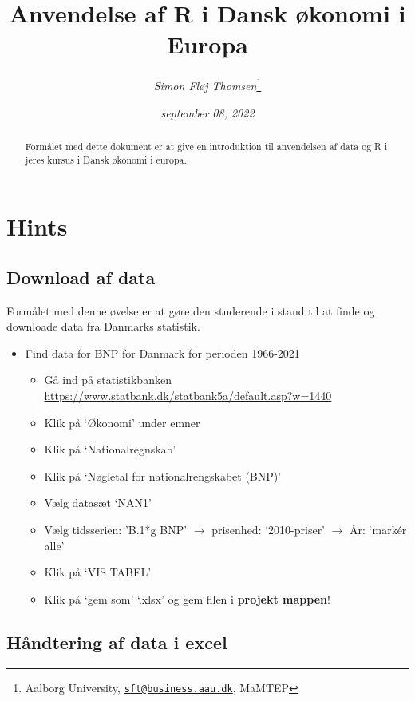 \documentclass[
  12pt,
]{article}
\title{Anvendelse af R i Dansk økonomi i Europa}
\author{\emph{Simon Fløj Thomsen}\footnote{Aalborg University,
  \href{mailto:sft@business.aau.dk}{\nolinkurl{sft@business.aau.dk}},
  MaMTEP}}
\date{\emph{september 08, 2022}}
\providecommand{\tightlist}{%
  \setlength{\itemsep}{0pt}\setlength{\parskip}{0pt}}
\begin{document}
\maketitle
\begin{abstract}
\begingroup Formålet med dette dokument er at give en introduktion til
anvendelsen af data og R i jeres kursus i Dansk økonomi i europa.
\endgroup
\end{abstract}

\newpage

\hypertarget{hints}{%
\section{Hints}\label{hints}}

\hypertarget{download-af-data}{%
\subsection{Download af data}\label{download-af-data}}

Formålet med denne øvelse er at gøre den studerende i stand til at finde
og downloade data fra Danmarks statistik.

\begin{itemize}
\tightlist
\item
  Find data for BNP for Danmark for perioden 1966-2021

  \begin{itemize}
  \tightlist
  \item
    Gå ind på statistikbanken
    \url{https://www.statbank.dk/statbank5a/default.asp?w=1440}
  \item
    Klik på `Økonomi' under emner
  \item
    Klik på `Nationalregnskab'
  \item
    Klik på `Nøgletal for nationalrengskabet (BNP)'
  \item
    Vælg datasæt `NAN1'
  \item
    Vælg tidsserien: 'B.1*g BNP' \(\rightarrow\) prisenhed:
    `2010-priser' \(\rightarrow\) År: `markér alle'
  \item
    Klik på `VIS TABEL'
  \item
    Klik på `gem som' `.xlsx' og gem filen i \textbf{projekt mappen}!
  \end{itemize}
\end{itemize}

\hypertarget{huxe5ndtering-af-data-i-excel}{%
\subsection{Håndtering af data i
excel}\label{huxe5ndtering-af-data-i-excel}}
\end{document}
